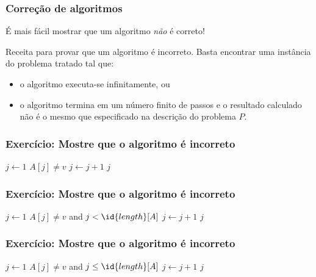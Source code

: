 \documentclass{beamer}
\begin{document}
\begin{frame}

  \frametitle{Correção de algoritmos}

  É mais fácil mostrar que um algoritmo \emph{não} é correto!
  \pause

  \begin{block}{Receita para provar que um algoritmo é incorreto.}
  Basta encontrar uma instância do problema tratado tal que:
  \begin{itemize}
    \item o algoritmo executa-se infinitamente, ou
    \item o algoritmo termina em um número finito de passos e o resultado
      calculado não é o mesmo que especificado na descrição do problema $P$.
  \end{itemize}
  \end{block}

\end{frame}

\begin{frame}

  \frametitle{Exercício: Mostre que o algoritmo é incorreto}

\begin{codebox}
\li $j \gets 1$
\li \While $A[j] \neq v$
\li \Do
      $j \gets j+1$
    \End
\li \Return $j$
\end{codebox}  

\end{frame}

\begin{frame}
  \frametitle{Exercício: Mostre que o algoritmo é incorreto}

\begin{codebox}
\li $j \gets 1$
\li \While $A[j] \neq v$ and $j < \id{length}[A]$
\li \Do
      $j \gets j+1$
    \End
\li \Return $j$
\end{codebox}  

\end{frame}

\begin{frame}

\frametitle{Exercício: Mostre que o algoritmo é incorreto}

\begin{codebox}
\li $j \gets 1$
\li \While $A[j] \neq v$ and $j \le \id{length}[A]$
\li \Do
      $j \gets j+1$
    \End
\li \Return $j$
\end{codebox}  

\end{frame}
\end{document}
